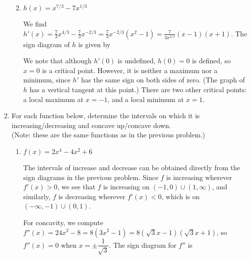 \documentclass[12pt]{article}
\begin{document}
\begin{enumerate}
\begin{enumerate}
\bigskip

 \item $h(x) = x^{7/3}-7x^{1/3}$

\bigskip

We find $h'(x) = \frac{7}{3}x^{4/3}-\frac{7}{3}x^{-2/3} = \frac{7}{3}x^{-2/3}(x^2-1) = \frac{7}{3x^{2/3}}(x-1)(x+1)$. The sign diagram of $h$ is given by
\begin{center}
\end{center}
We note that although $h'(0)$ is undefined, $h(0)=0$ is defined, so $x=0$ is a critical point. However, it is neither a maximum nor a minimum, since $h'$ has the same sign on both sides of zero. (The graph of $h$ has a vertical tangent at this point.) There are two other critical points: a local maximum at $x=-1$, and a local minimum at $x=1$.
\end{enumerate}

\newpage

 \item For each function below, determine the intervals on which it is increasing/decreasing and concave up/concave down.\\
(Note: these are the same functions as in the previous problem.)

\begin{enumerate}
 \item $f(x) = 2x^4-4x^2+6$

\bigskip

The intervals of increase and decrease can be obtained directly from the sign diagrams in the previous problem. Since $f$ is increasing wherever $f'(x)>0$, we see that $f$ is increasing on $(-1,0)\cup (1,\infty)$, and similarly, $f$ is decreasing wherever $f'(x)<0$, which is on $(-\infty,-1)\cup (0,1)$.

For concavity, we compute $f''(x) = 24x^2-8 = 8(3x^2-1) = 8(\sqrt{3}x-1)(\sqrt{3}x+1)$, so $f''(x)=0$ when $x=\pm \dfrac{1}{\sqrt{3}}$. The sign diagram for $f''$ is
\begin{center}
\end{center}


\end{enumerate}
\end{enumerate}
\end{document}
